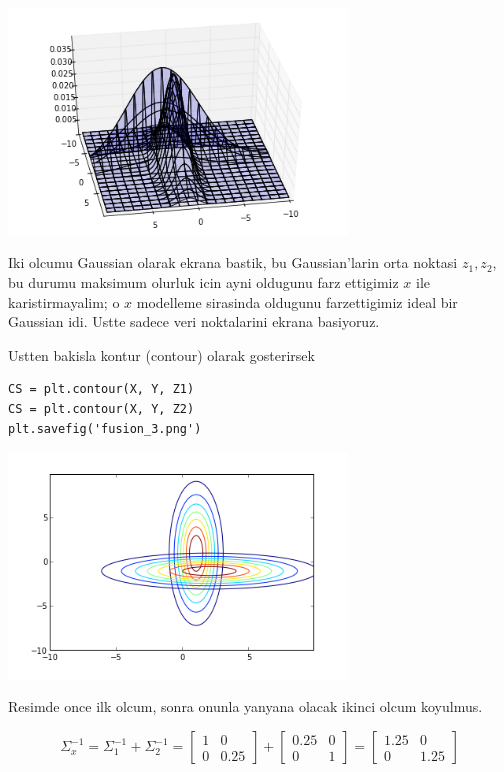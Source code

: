 \documentclass[12pt,fleqn]{article}\usepackage{../common}
\begin{document}
\includegraphics[height=6cm]{fusion_1.png}

Iki olcumu Gaussian olarak ekrana bastik, bu Gaussian'larin orta noktasi
$z_1,z_2$, bu durumu maksimum olurluk icin ayni oldugunu farz ettigimiz $x$
ile karistirmayalim; o $x$ modelleme sirasinda oldugunu farzettigimiz ideal
bir Gaussian idi. Ustte sadece veri noktalarini ekrana basiyoruz. 


Ustten bakisla kontur (contour) olarak gosterirsek 

\begin{verbatim}
CS = plt.contour(X, Y, Z1)
CS = plt.contour(X, Y, Z2)
plt.savefig('fusion_3.png')
\end{verbatim}

\includegraphics[height=6cm]{fusion_3.png}


Resimde once ilk olcum, sonra onunla yanyana olacak ikinci olcum koyulmus. 

$$ \Sigma_x^{-1} = \Sigma_1^{-1} + \Sigma_2^{-1}  =
\left[\begin{array}{cc}
1 & 0 \\ 0 & 0.25
\end{array}\right] + 
\left[\begin{array}{cc}
0.25 & 0 \\ 0 & 1
\end{array}\right] =
\left[\begin{array}{cc}
1.25 & 0 \\ 0 & 1.25
\end{array}\right] 
$$
\end{document}
